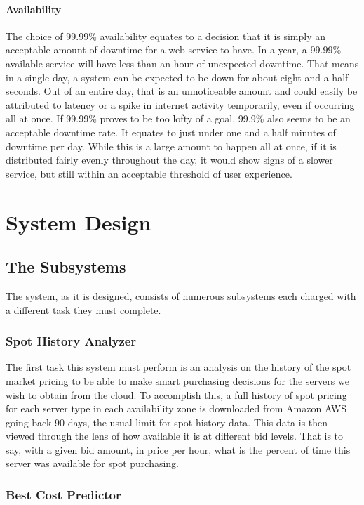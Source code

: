 \documentclass[thesis,proposal]{umassthesis}  %
\begin{document}
\subsubsection{Availability}
The choice of 99.99\% availability equates to a decision that it is simply an acceptable amount of downtime for a web service to have. In a year, a 99.99\% available service will have less than an hour of unexpected downtime. That means in a single day, a system can be expected to be down for about eight and a half seconds. Out of an entire day, that is an unnoticeable amount and could easily be attributed to latency or a spike in internet activity temporarily, even if occurring all at once. If 99.99\% proves to be too lofty of a goal, 99.9\% also seems to be an acceptable downtime rate. It equates to just under one and a half minutes of downtime per day. While this is a large amount to happen all at once, if it is distributed fairly evenly throughout the day, it would show signs of a slower service, but still within an acceptable threshold of user experience.



\chapter{System Design}

\section{The Subsystems}
The system, as it is designed, consists of numerous subsystems each charged with a different task they must complete.

\subsection{Spot History Analyzer}
The first task this system must perform is an analysis on the history of the spot market pricing to be able to make smart purchasing decisions for the servers we wish to obtain from the cloud. To accomplish this, a full history of spot pricing for each server type in each availability zone is downloaded from Amazon AWS going back 90 days, the usual limit for spot history data. This data is then viewed through the lens of how available it is at different bid levels. That is to say, with a given bid amount, in price per hour, what is the percent of time this server was available for spot purchasing. 



\subsection{Best Cost Predictor}
\end{document}
